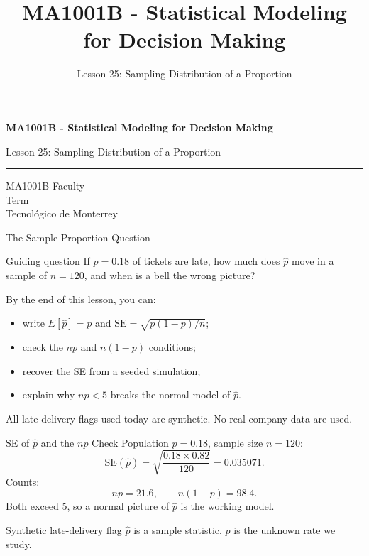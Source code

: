 \documentclass[aspectratio=169,10pt,english]{beamer}
\title{MA1001B - Statistical Modeling for Decision Making}
\subtitle{Lesson 25: Sampling Distribution of a Proportion}
\author{}
\institute{Tecnol\'ogico de Monterrey}
\date{}
\begin{document}
\begin{frame}[plain]
  \vspace{1.2cm}
  {\Large\bfseries MA1001B - Statistical Modeling for Decision Making\par}
  \vspace{0.7cm}
  {\large Lesson 25: Sampling Distribution of a Proportion\par}
  \vspace{0.7cm}
  {\color{TecRojo}\rule{\textwidth}{1.2pt}}
  \vspace{0.8cm}

  MA1001B Faculty\\[0.3cm]
  Term\\[0.3cm]
  Tecnol\'ogico de Monterrey
\end{frame}

\begin{frame}{The Sample-Proportion Question}
  \begin{alertblock}{Guiding question}
    If $p=0.18$ of tickets are late, how much does $\hat p$ move in a
    sample of $n=120$, and when is a bell the wrong picture?
  \end{alertblock}

  \vspace{0.6em}
  By the end of this lesson, you can:
  \begin{itemize}
    \item write $E[\hat p]=p$ and $\mathrm{SE}=\sqrt{p(1-p)/n}$;
    \item check the $np$ and $n(1-p)$ conditions;
    \item recover the SE from a seeded simulation;
    \item explain why $np<5$ breaks the normal model of $\hat p$.
  \end{itemize}

  \vfill
  \scriptsize All late-delivery flags used today are synthetic. No real company data are used.
\end{frame}

\begin{frame}{SE of $\hat p$ and the $np$ Check}
  \small
  Population $p=0.18$, sample size $n=120$:
  \[
    \mathrm{SE}(\hat p)=\sqrt{\frac{0.18\times 0.82}{120}}=0.035071.
  \]
  Counts:
  \[
    np=21.6,\qquad n(1-p)=98.4.
  \]
  Both exceed 5, so a normal picture of $\hat p$ is the working model.

  \vspace{0.3em}
  \begin{exampleblock}{Synthetic late-delivery flag}
    $\hat p$ is a sample statistic. $p$ is the unknown rate we study.
  \end{exampleblock}
\end{frame}
\end{document}
